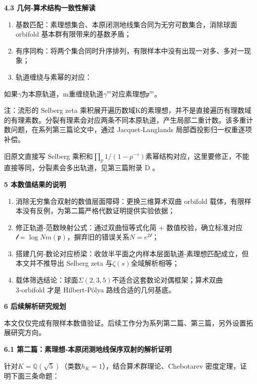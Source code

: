 \documentclass[12pt]{article}
\begin{document}
\textbf{4.3 几何‑算术结构一致性解读}

\begin{enumerate}
\def\labelenumi{\arabic{enumi}.}
\item
  基数匹配：素理想集合、本原闭测地线集合同为无穷可数集合，消除球面
  orbifold 基本群有限带来的基数矛盾；
\item
  有序同构：将两个集合同时升序排列，有限样本中没有出现一对多、多对一现象；
\item
  轨道缠绕与素幂的对应：
\end{enumerate}

如果\(\gamma\)为本原轨道，m重缠绕轨道\(\gamma^{m}\)对应素理想\(\mathfrak{p}^{m}\)。

注：流形的 Selberg zeta
乘积展开遍历数域K的素理想，并不是直接遍历有理数域的有理素数。分裂有理素会对应两条不同本原轨道，产生局部二重计数。该多重计数问题，在系列第三篇论文中，通过
Jacquet‑Langlands 局部酉投影归一权重逐项补偿。

旧原文直接写 Selberg
乘积和\(\prod_{p}^{}1/\left( 1 - p^{- s} \right)\)素幂结构对应，这里要修正，不能直接等同，分裂素会多出轨道，见第三篇附录
D 。

\textbf{5 本数值结果的说明}

\begin{enumerate}
\def\labelenumi{\arabic{enumi}.}
\item
  消除无穷集合双射的数值层面障碍：更换三维算术双曲 orbifold
  载体，有限样本没有反例，为第二篇严格代数证明提供实验依据；
\item
  修正轨道‑范数映射公式：通过双曲恒等式化简 +
  数值校验，确立标准对应\(\mathcal{l =}\log Nm\left( \mathfrak{p} \right)\)，摒弃旧的错误关系\(N = e^{2\mathcal{l}}\)；
\item
  搭建几何‑数论对应桥梁：收敛半平面之内样本层面轨道‑素理想匹配成立，但本文并不推导出
  Selberg zeta 与\(\zeta(s)\)全域解析相等；
\item
  载体筛选结论：球面\(\Sigma(2,3,5)\)不适合这套数论对偶框架；算术双曲
  3‑orbifold 才是 Hilbert‑Pólya 路线合适的几何基底。
\end{enumerate}

\textbf{6 后续解析研究规划}

本文仅仅完成有限样本数值验证。后续工作分为系列第二篇、第三篇，另外设置拓展研究方向。

\textbf{6.1 第二篇：素理想‑本原闭测地线保序双射的解析证明}

针对\(K = \mathbb{Q}\left( \sqrt{5} \right)\)（类数\(h_{K} = 1\)），结合算术群理论、Chebotarev
密度定理，证明下面三条命题：
\end{document}
